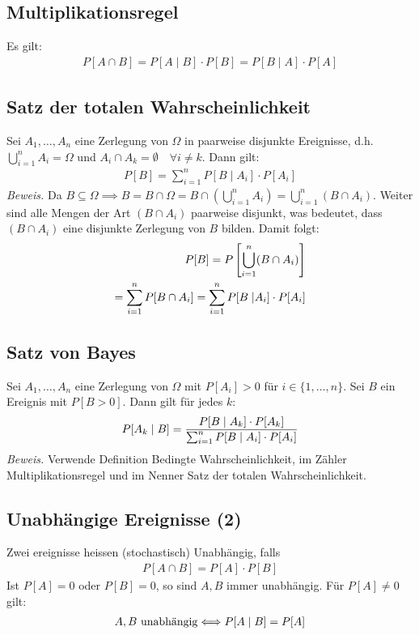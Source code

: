 \subsection*{Multiplikationsregel}
Es gilt:
\begin{align*}
  P[A \cap B] = P[A \;|\; B] \cdot P[B] = P[B \;|\; A] \cdot P[A]
\end{align*}
\subsection*{Satz der totalen Wahrscheinlichkeit}
Sei $A_1, \dots, A_n$ eine Zerlegung von $\Omega$ in paarweise disjunkte
Ereignisse, d.h. $\bigcup_{i = 1}^n A_i = \Omega$ und $A_i \cap A_k = \emptyset
  \quad \forall i \neq k$. Dann gilt:
\begin{align*}
  P[B] = \sum_{i = 1}^n P[B \; | \; A_i] \cdot P[A_i]
\end{align*}
\emph{Beweis.}
Da $B \subseteq \Omega \implies B = B \cap \Omega
  = B \cap  (\bigcup_{i=1}^n A_i) = \bigcup_{i = 1}^n  (B \cap A_i)$.
Weiter sind alle Mengen der Art $ (B \cap A_i)$ paarweise disjunkt,
was bedeutet, dass $ (B \cap A_i)$ eine disjunkte Zerlegung von $B$
bilden. Damit folgt:
\begin{align*}
  P[B] = P \left[ \bigcup_{i = 1}^n  (B \cap A_i)\right] \\
  = \sum_{i = 1}^n P[B \cap A_i] = \sum_{i = 1}^n P[B \; | A_i] \cdot P[A_i]
\end{align*}
\subsection*{Satz von Bayes}
Sei $A_1, \dots, A_n$ eine Zerlegung von $\Omega$ mit $P[A_i] > 0$ für $i \in
  \{1, \dots, n\}$. Sei $B$ ein Ereignis mit $P[B > 0]$. Dann gilt für jedes $k$:
\begin{align*}
  P[A_k \; | \; B] = \frac{P[B \; | \; A_k] \cdot P[A_k] }{\sum_{i = 1}^n P[B \; | \; A_i] \cdot P[A_i]}
\end{align*}
\emph{Beweis.} Verwende Definition Bedingte Wahrscheinlichkeit,
im Zähler Multiplikationsregel und im Nenner Satz der totalen Wahrscheinlichkeit.
\subsection*{Unabhängige Ereignisse  (2)}
Zwei ereignisse heissen (stochastisch) Unabhängig, falls
\begin{align*}
  P[A \cap B] = P[A] \cdot P[B]
\end{align*}
Ist $P[A] = 0$ oder $P[B] = 0$, so sind $A, B$ immer unabhängig.
Für $P[A] \neq 0$ gilt:
\begin{align*}
  A, B \text{ unabhängig} \Longleftrightarrow P[A \; | \; B] = P[A]
\end{align*}
